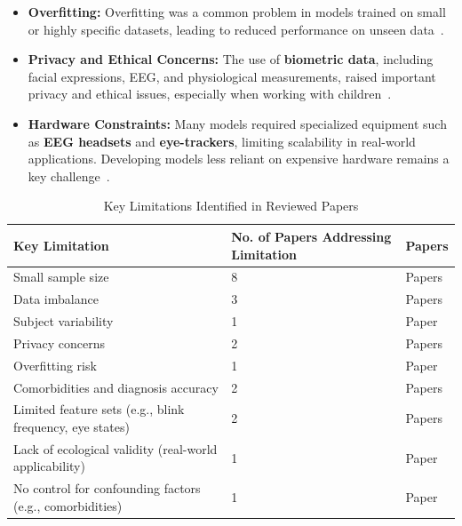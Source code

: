 \documentclass[twocolumn,12pt]{article}
\begin{document}
{\begin{itemize}
    \item \textbf{Overfitting:} Overfitting was a common problem in models trained on small or highly specific datasets, leading to reduced performance on unseen data~\citep{ref6,ref15}.
    
    \item \textbf{Privacy and Ethical Concerns:} The use of \textbf{biometric data}, including facial expressions, EEG, and physiological measurements, raised important privacy and ethical issues, especially when working with children~\citep{ref6,ref15}.
    
    \item \textbf{Hardware Constraints:} Many models required specialized equipment such as \textbf{EEG headsets} and \textbf{eye-trackers}, limiting scalability in real-world applications. Developing models less reliant on expensive hardware remains a key challenge~\citep{ref8,ref14}.
\end{itemize}

\begin{table}[H]
\centering
\footnotesize
\setlength{\tabcolsep}{1pt}
\renewcommand{\arraystretch}{1.5}
\caption{Key Limitations Identified in Reviewed Papers}
\begin{tabular}{|p{}|p{}|p{}|}
\hline
\textbf{Key Limitation} & \textbf{No. of Papers Addressing 
Limitation} & \textbf{Papers} \\
\hline
Small sample size & 8 & Papers~\citep{ref2,ref3,ref4,ref7,ref10,ref12,ref14,ref15} \\
\hline
Data imbalance & 3 & Papers~\citep{ref9,ref11,ref13} \\
\hline
Subject variability & 1 & Paper~\citep{ref3} \\
\hline
Privacy concerns & 2 & Papers~\citep{ref6,ref8} \\
\hline
Overfitting risk & 1 & Paper~\citep{ref13} \\
\hline
Comorbidities and diagnosis accuracy & 2 & Papers~\citep{ref5,ref15} \\
\hline
Limited feature sets (e.g., blink frequency, eye states) & 2 & Papers~\citep{ref7,ref8} \\
\hline
Lack of ecological validity (real-world applicability) & 1 & Paper~\citep{ref16} \\
\hline
No control for confounding factors (e.g., comorbidities) & 1 & Paper~\citep{ref15} \\
\hline
\end{tabular}
\end{table}

}
\end{document}
